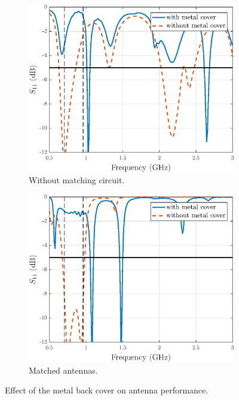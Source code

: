 \begin{figure}[H]
    \centering 
    \begin{subfigure}[b]{0.49\textwidth}
        \includegraphics[width=\textwidth]{img/metal_vs_nometal.eps}
        \caption{Without matching circuit.}
        \label{fig:metal_vs_nometal}
    \end{subfigure}
    \begin{subfigure}[b]{0.49\textwidth}
        \includegraphics[width=\textwidth]{img/metal_vs_nometal_matched.eps}
        \caption{Matched antennas.}
        \label{fig:metal_vs_nometal_matched}
    \end{subfigure}
    \caption{Effect of the metal back cover on antenna performance.}
    \label{fig:metal_vs_nometal_results}
\end{figure}


